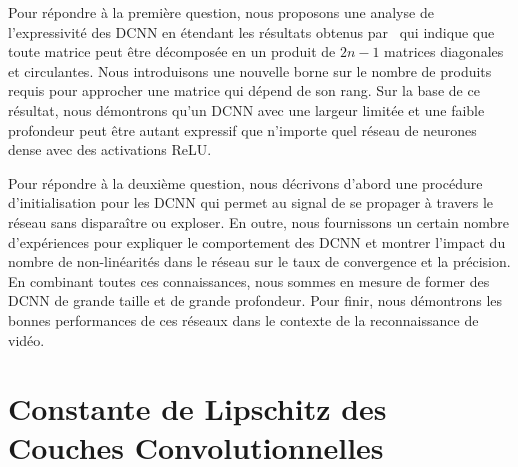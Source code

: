 Pour répondre à la première question, nous proposons une analyse de l'expressivité des DCNN en étendant les résultats obtenus par~\citet{huhtanen2015factoring} qui indique que toute matrice peut être décomposée en un produit de $2n-1$ matrices diagonales et circulantes.
Nous introduisons une nouvelle borne sur le nombre de produits requis pour approcher une matrice qui dépend de son rang.
Sur la base de ce résultat, nous démontrons qu'un DCNN avec une largeur limitée et une faible profondeur peut être autant expressif que n'importe quel réseau de neurones dense avec des activations ReLU. 

Pour répondre à la deuxième question, nous décrivons d'abord une procédure d'initialisation pour les DCNN qui permet au signal de se propager à travers le réseau sans disparaître ou exploser.
En outre, nous fournissons un certain nombre d'expériences pour expliquer le comportement des DCNN et montrer l'impact du nombre de non-linéarités dans le réseau sur le taux de convergence et la précision. 
En combinant toutes ces connaissances, nous sommes en mesure de former des DCNN de grande taille et de grande profondeur.
Pour finir, nous démontrons les bonnes performances de ces réseaux dans le contexte de la reconnaissance de vidéo. 




\section{Constante de Lipschitz des Couches Convolutionnelles}
\label{section:ap7-lipschitz_bound}


